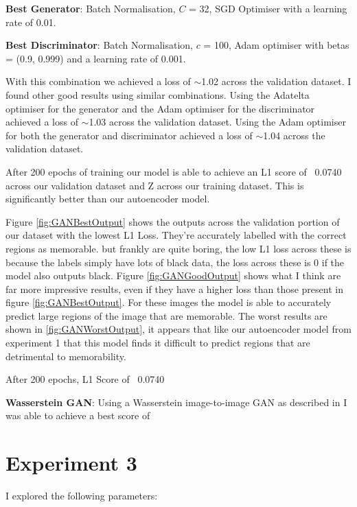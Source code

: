 \documentclass{UoYCSproject}
\begin{document}
\textbf{Best Generator}: Batch Normalisation, $C$ = 32, SGD Optimiser with a learning rate of 0.01.

\textbf{Best Discriminator}: Batch Normalisation, $c$ = 100, Adam optimiser with betas = (0.9, 0.999) and a learning rate of 0.001.

With this combination we achieved a loss of \(\sim\)1.02 across the validation dataset. I found other good results using similar combinations. Using the Adatelta optimiser for the generator and the Adam optimiser for the discriminator achieved a loss of \(\sim\)1.03 across the validation dataset. Using the Adam optimiser for both the generator and discriminator achieved a loss of \(\sim\)1.04 across the validation dataset.


After 200 epochs of training our model is able to achieve an L1 score of ~0.0740 across our validation dataset and Z across our training dataset.
This is significantly better than our autoencoder model. 

Figure \ref{fig:GANBestOutput} shows the outputs across the validation portion of our dataset with the lowest L1 Loss. They're accurately labelled with the correct regions as memorable. 
but frankly are quite boring, the low L1 loss across these is because the labels simply have lots of black data, the loss across these is 0 if the model also outputs black. 
Figure \ref{fig:GANGoodOutput} shows what I think are far more impressive results, even if they have a higher loss than those present in figure \ref{fig:GANBestOutput}. For these images the model is able to accurately predict large regions of the image that are memorable.
The worst results are shown in \ref{fig:GANWorstOutput}, it appears that like our autoencoder model from experiment 1 that this model finds it difficult to predict regions that are detrimental to memorability. 

After 200 epochs, L1 Score of ~0.0740


\textbf{Wasserstein GAN}: Using a Wasserstein image-to-image GAN as described in \cite{pix2pixwasserstein} I was able to achieve a best score of


\section{Experiment 3}

I explored the following parameters:
\end{document}
